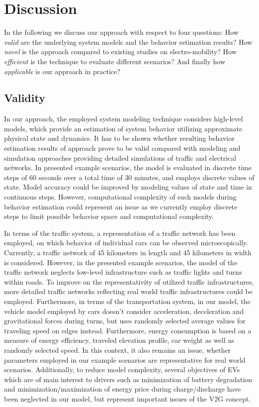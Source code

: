 \section{Discussion}
\label{section:discussion}

In the following we discuss our approach with respect to four questions: How \textit{valid} are the underlying system models and the behavior estimation results? How \textit{novel} is the approach compared to existing studies on electro-mobility? How \textit{efficient} is the technique to evaluate different scenarios? And finally how \textit{applicable} is our approach in practice?

\subsection{Validity}

In our approach, the employed system modeling technique considers high-level models, which provide an estimation of system behavior utilizing approximate physical state and dynamics. It has to be shown whether resulting behavior estimation results of approach prove to be valid compared with modeling and simulation approaches providing detailed simulations of traffic and electrical networks. In presented example scenarios, the model is evaluated in discrete time steps of 60 seconds over a total time of 30 minutes, and employs discrete values of state. Model accuracy could be improved by modeling values of state and time in continuous steps. However, computational complexity of such models during behavior estimation could represent an issue as we currently employ discrete steps to limit possible behavior space and computational complexity.

In terms of the traffic system, a representation of a traffic network has been employed, on which behavior of individual cars can be observed microscopically. Currently, a traffic network of 45 kilometers in length and 45 kilometers in width is considered. However, in the presented example scenarios, the model of the traffic network neglects low-level infrastructure such as traffic lights and turns within roads. To improve on the representativity of utilized traffic infrastructures, more detailed traffic networks reflecting real world traffic infrastructures could be employed. Furthermore, in terms of the transportation system, in our model, the vehicle model employed by cars doesn't consider acceleration, deceleration and gravitational forces during turns, but uses randomly selected average values for traveling speed on edges instead. Furthermore, energy consumption is based on a measure of energy efficiency, traveled elevation profile, car weight as well as randomly selected speed. In this context, it also remains an issue, whether parameters employed in our example scenarios are representative for real world scenarios. Additionally, to reduce model complexity, several objectives of EVs which are of main interest to drivers such as minimization of battery degradation and minimization/maximization of energy price during charge/discharge have been neglected in our model, but represent important issues of the V2G concept.

